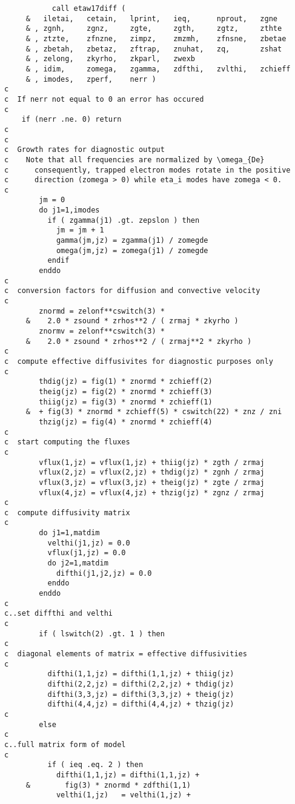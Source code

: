\begin{verbatim}
           call etaw17diff ( 
     &   iletai,   cetain,   lprint,   ieq,      nprout,   zgne
     & , zgnh,     zgnz,     zgte,     zgth,     zgtz,     zthte
     & , ztzte,    zfnzne,   zimpz,    zmzmh,    zfnsne,   zbetae
     & , zbetah,   zbetaz,   zftrap,   znuhat,   zq,       zshat
     & , zelong,   zkyrho,   zkparl,   zwexb
     & , idim,     zomega,   zgamma,   zdfthi,   zvlthi,   zchieff
     & , imodes,   zperf,    nerr )
c
c  If nerr not equal to 0 an error has occured
c
	if (nerr .ne. 0) return
c
c
c  Growth rates for diagnostic output
c    Note that all frequencies are normalized by \omega_{De}
c      consequently, trapped electron modes rotate in the positive
c      direction (zomega > 0) while eta_i modes have zomega < 0.
c
        jm = 0
        do j1=1,imodes
          if ( zgamma(j1) .gt. zepslon ) then
            jm = jm + 1
            gamma(jm,jz) = zgamma(j1) / zomegde
            omega(jm,jz) = zomega(j1) / zomegde
          endif
        enddo
c
c  conversion factors for diffusion and convective velocity
c
        znormd = zelonf**cswitch(3) *
     &    2.0 * zsound * zrhos**2 / ( zrmaj * zkyrho )
        znormv = zelonf**cswitch(3) *
     &    2.0 * zsound * zrhos**2 / ( zrmaj**2 * zkyrho )
c
c  compute effective diffusivites for diagnostic purposes only
c
        thdig(jz) = fig(1) * znormd * zchieff(2)
        theig(jz) = fig(2) * znormd * zchieff(3)
        thiig(jz) = fig(3) * znormd * zchieff(1)
     &  + fig(3) * znormd * zchieff(5) * cswitch(22) * znz / zni
        thzig(jz) = fig(4) * znormd * zchieff(4)
c
c  start computing the fluxes
c
        vflux(1,jz) = vflux(1,jz) + thiig(jz) * zgth / zrmaj
        vflux(2,jz) = vflux(2,jz) + thdig(jz) * zgnh / zrmaj
        vflux(3,jz) = vflux(3,jz) + theig(jz) * zgte / zrmaj
        vflux(4,jz) = vflux(4,jz) + thzig(jz) * zgnz / zrmaj
c
c  compute diffusivity matrix
c
        do j1=1,matdim
          velthi(j1,jz) = 0.0
          vflux(j1,jz) = 0.0
          do j2=1,matdim
            difthi(j1,j2,jz) = 0.0
          enddo
        enddo
c
c..set diffthi and velthi
c
        if ( lswitch(2) .gt. 1 ) then
c
c  diagonal elements of matrix = effective diffusivities
c
          difthi(1,1,jz) = difthi(1,1,jz) + thiig(jz)
          difthi(2,2,jz) = difthi(2,2,jz) + thdig(jz)
          difthi(3,3,jz) = difthi(3,3,jz) + theig(jz)
          difthi(4,4,jz) = difthi(4,4,jz) + thzig(jz)
c
        else
c
c..full matrix form of model
c
          if ( ieq .eq. 2 ) then
            difthi(1,1,jz) = difthi(1,1,jz) +
     &        fig(3) * znormd * zdfthi(1,1)
            velthi(1,jz)   = velthi(1,jz) +

\end{verbatim}

